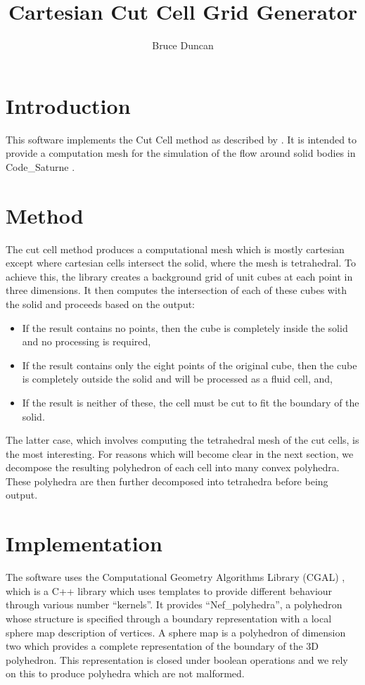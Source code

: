 \documentclass[a4paper,10pt]{article}
\title{Cartesian Cut Cell Grid Generator}
\author{Bruce Duncan}
\begin{document}
\maketitle

\section{Introduction}

This software implements the Cut Cell method as described by \cite{dingram}. It
is intended to provide a computation mesh for the simulation of the flow around
solid bodies in Code\_Saturne \cite{code_saturne}.

\section{Method}

The cut cell method produces a computational mesh which is mostly cartesian
except where cartesian cells intersect the solid, where the mesh is
tetrahedral. To achieve this, the library creates a background grid of unit
cubes at each point in three dimensions. It then computes the intersection of
each of these cubes with the solid and proceeds based on the output:
\begin{itemize}
 \item If the result contains no points, then the cube is completely inside the
solid and no processing is required,
\item If the result contains only the eight points of the original cube, then
the cube is completely outside the solid and will be processed as a fluid cell,
and,
\item If the result is neither of these, the cell must be cut to fit the
boundary of the solid.
\end{itemize}

The latter case, which involves computing the tetrahedral mesh of the cut cells,
is the most interesting. For reasons which will become clear in the next
section, we decompose the resulting polyhedron of each cell into many convex
polyhedra. These polyhedra are then further decomposed into tetrahedra before
being output.

\section{Implementation}

The software uses the Computational Geometry Algorithms Library (CGAL)
\cite{cgal}, which is a C++ library which uses templates to provide different
behaviour through various number ``kernels''. It provides ``Nef\_polyhedra'', a
polyhedron whose structure is specified through a boundary representation
with a local sphere map description of vertices. A sphere map is a polyhedron of
dimension two which provides a complete representation of the boundary of the 3D
polyhedron. This representation is closed under boolean operations and we rely
on this to produce polyhedra which are not malformed.
\end{document}
